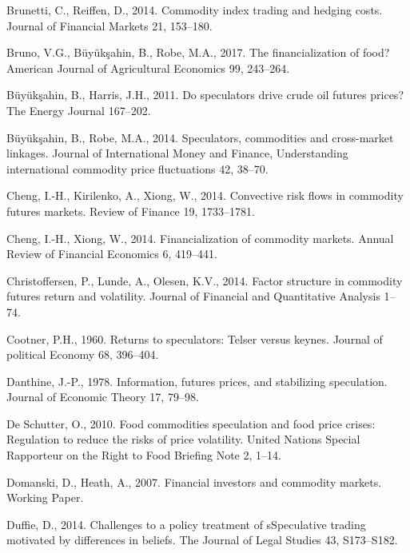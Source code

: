 \documentclass[]{elsarticle} %
\begin{document}
\leavevmode\hypertarget{ref-brunetti_commodity_2014}{}%
Brunetti, C., Reiffen, D., 2014. Commodity index trading and hedging costs. Journal of Financial Markets 21, 153--180.

\leavevmode\hypertarget{ref-bruno_financialisation_2017}{}%
Bruno, V.G., Büyükşahin, B., Robe, M.A., 2017. The financialization of food? American Journal of Agricultural Economics 99, 243--264.

\leavevmode\hypertarget{ref-buyuksahin_speculators_2011}{}%
Büyükşahin, B., Harris, J.H., 2011. Do speculators drive crude oil futures prices? The Energy Journal 167--202.

\leavevmode\hypertarget{ref-buyuksahin_speculators_2014}{}%
Büyükşahin, B., Robe, M.A., 2014. Speculators, commodities and cross-market linkages. Journal of International Money and Finance, Understanding international commodity price fluctuations 42, 38--70.

\leavevmode\hypertarget{ref-cheng_convective_2014}{}%
Cheng, I.-H., Kirilenko, A., Xiong, W., 2014. Convective risk flows in commodity futures markets. Review of Finance 19, 1733--1781.

\leavevmode\hypertarget{ref-cheng_financialisation_2014}{}%
Cheng, I.-H., Xiong, W., 2014. Financialization of commodity markets. Annual Review of Financial Economics 6, 419--441.

\leavevmode\hypertarget{ref-christoffersen_factor_2014}{}%
Christoffersen, P., Lunde, A., Olesen, K.V., 2014. Factor structure in commodity futures return and volatility. Journal of Financial and Quantitative Analysis 1--74.

\leavevmode\hypertarget{ref-cootner_returns_1960}{}%
Cootner, P.H., 1960. Returns to speculators: Telser versus keynes. Journal of political Economy 68, 396--404.

\leavevmode\hypertarget{ref-danthine_information_1978}{}%
Danthine, J.-P., 1978. Information, futures prices, and stabilizing speculation. Journal of Economic Theory 17, 79--98.

\leavevmode\hypertarget{ref-deschutter_food_2010}{}%
De Schutter, O., 2010. Food commodities speculation and food price crises: Regulation to reduce the risks of price volatility. United Nations Special Rapporteur on the Right to Food Briefing Note 2, 1--14.

\leavevmode\hypertarget{ref-domanski_financial_2007}{}%
Domanski, D., Heath, A., 2007. Financial investors and commodity markets. Working Paper.

\leavevmode\hypertarget{ref-duffie_challenges_2014}{}%
Duffie, D., 2014. Challenges to a policy treatment of sSpeculative trading motivated by differences in beliefs. The Journal of Legal Studies 43, S173--S182.
\end{document}
